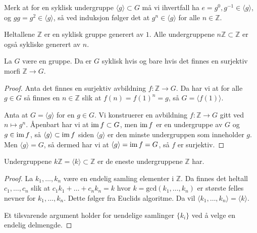 \begin{remark}\label{rmk:cyclic-structure}
    Merk at for en syklisk undergruppe $\langle g\rangle\subset G$
    må vi ihvertfall ha $e = g^0, g^{-1}\in \langle g\rangle$,
    og $gg = g^2\in \langle g\rangle$,
    så ved induksjon følger det at $g^n\in \langle g\rangle$
    for alle $n\in \mathbb Z$.
\end{remark}

\begin{example}
    Heltallene $\mathbb Z$ er en syklisk gruppe generert av $1$.
    Alle undergruppene $n\mathbb Z\subset \mathbb Z$ er også sykliske generert av
    $n$.
\end{example}

\begin{lemma}\label{thm:cyclic-surjection}
    La $G$ være en gruppe.
    Da er $G$ syklisk hvis og bare hvis det finnes en surjektiv morfi
    $\mathbb Z\to G$.
\end{lemma}
\begin{proof}
    Anta det finnes en surjektiv avbildning $f\colon \mathbb Z\to G$.
    Da har vi at for alle $g\in G$ så finnes en $n\in \mathbb Z$ slik at
    $f(n) = f(1)^n = g$, så $G = \langle f(1)\rangle$.

    Anta at $G = \langle g \rangle$ for en $g\in G$.
    Vi konstruerer en avbildning $f\colon \mathbb Z\to G$
    gitt ved $n\mapsto g^n$.
    Åpenbart har vi at $\operatorname{im} f\subset G$,
    men $\operatorname{im} f$ er en undergruppe av $G$ og $g\in \operatorname{im} f$,
    så $\langle g\rangle\subset \operatorname{im} f$ siden $\langle g\rangle$
    er den minste undergruppen som inneholder $g$.
    Men $\langle g\rangle = G$,
    så dermed har vi at $\langle g \rangle = \operatorname{im} f = G$,
    så $f$ er surjektiv.
\end{proof}

\begin{corollary}\label{thm:integer-subgroups}
    Undergruppene $k\mathbb Z = \langle k\rangle \subset \mathbb Z$
    er de eneste undergruppene $\mathbb Z$ har.
\end{corollary}
\begin{proof}
    La $k_1, \dots, k_n$ være en endelig samling elementer i $\mathbb Z$.
    Da finnes det heltall $c_1,\dots,c_n$ slik at $c_1 k_1 + \dots + c_n k_n = k$
    hvor $k = \mathrm{gcd}(k_1,\dots,k_n)$
    er største felles nevner for $k_1,\dots, k_n$.
    Dette følger fra Euclids algoritme.
    Da vil $\langle k_1,\dots, k_n\rangle = \langle k\rangle$.

    Et tilsvarende argument holder for uendelige samlinger $\{k_i\}$
    ved å velge en endelig delmengde.
\end{proof}

